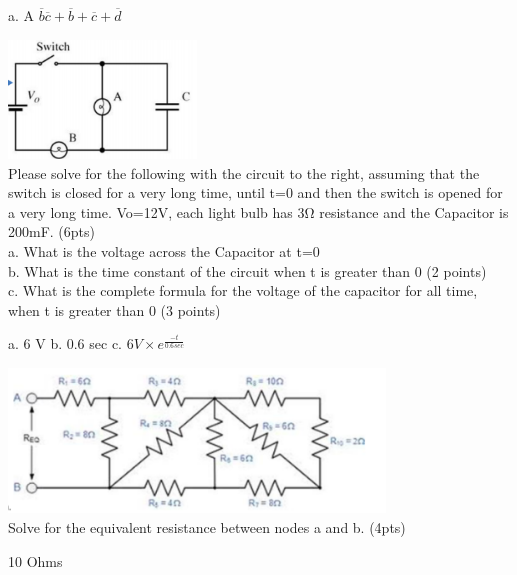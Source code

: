 \documentclass[10pt]{examdesign}
\begin{document}
\begin{shortanswer}[title={Short Answer},rearrange=no,resetcounter=no]
\begin{question}
        \begin{answer}
        a. A $\overline{b}\overline{c}+\overline{b}+\overline{c}+\overline{d}$
        \end{answer}
        \end{question}
        \begin{question}
        \includegraphics[width=5cm]{circuit5.png}
        \\Please solve for the following with the circuit to the right, assuming that the switch is closed for a very long time, until t=0 and then the switch is opened for a very long time. Vo=12V, each light bulb has 3Ω resistance and the Capacitor is 200mF. (6pts)
        \\a. What is the voltage across the Capacitor at t=0
        \\b. What is the time constant of the circuit when t is greater than 0 (2 points)
        \\c. What is the complete formula for the voltage of the capacitor for all time, when t is greater than 0 (3 points)
        \begin{answer}
        a. 6 V
        b. 0.6 sec
        c. $6 V\times e^\frac{-t}{0.6 sec}$
        \end{answer}
        \end{question}
        \begin{question}
        \includegraphics[width=10cm]{circuit6.png}
        \\Solve for the equivalent resistance between nodes a and b. (4pts)
        \begin{answer}
        10 Ohms
        \end{answer}
        \end{question}
        \begin{question}

\end{question}
\end{shortanswer}
\end{document}
